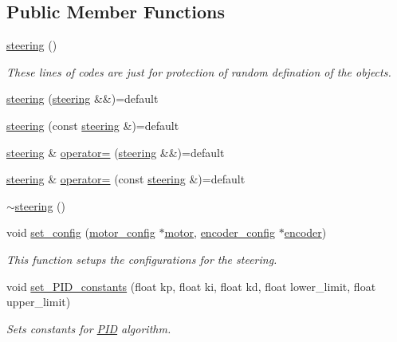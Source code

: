 \subsection*{Public Member Functions}
\begin{DoxyCompactItemize}
\item 
\mbox{\hyperlink{classsteering_a55383df3b5eb0bbd66cd9ef76c82b588}{steering}} ()
\begin{DoxyCompactList}\small\item\em These lines of codes are just for protection of random defination of the objects. \end{DoxyCompactList}\item 
\mbox{\hyperlink{classsteering_ac941b5d9c6daae87122f984819606475}{steering}} (\mbox{\hyperlink{classsteering}{steering}} \&\&)=default
\item 
\mbox{\hyperlink{classsteering_a5646ad884f0949253988d9a8ebec8278}{steering}} (const \mbox{\hyperlink{classsteering}{steering}} \&)=default
\item 
\mbox{\hyperlink{classsteering}{steering}} \& \mbox{\hyperlink{classsteering_aab3b80efec6ef14734213ec15c228543}{operator=}} (\mbox{\hyperlink{classsteering}{steering}} \&\&)=default
\item 
\mbox{\hyperlink{classsteering}{steering}} \& \mbox{\hyperlink{classsteering_ab6e1570939ecfb89acb3905efe6cb334}{operator=}} (const \mbox{\hyperlink{classsteering}{steering}} \&)=default
\item 
\mbox{\hyperlink{classsteering_a9b686e0fb626c3e8dd16ee5106a842b7}{$\sim$steering}} ()
\item 
void \mbox{\hyperlink{classsteering_a849eba14376618441a86e0ccdc1dc066}{set\+\_\+config}} (\mbox{\hyperlink{structmotor__config}{motor\+\_\+config}} $\ast$\mbox{\hyperlink{classmotor}{motor}}, \mbox{\hyperlink{structencoder__config}{encoder\+\_\+config}} $\ast$\mbox{\hyperlink{classencoder}{encoder}})
\begin{DoxyCompactList}\small\item\em This function setups the configurations for the steering. \end{DoxyCompactList}\item 
void \mbox{\hyperlink{classsteering_a6fb4cfdc9378336f78832351c4f6d181}{set\+\_\+\+P\+I\+D\+\_\+constants}} (float kp, float ki, float kd, float lower\+\_\+limit, float upper\+\_\+limit)
\begin{DoxyCompactList}\small\item\em Sets constants for \mbox{\hyperlink{class_p_i_d}{P\+ID}} algorithm. \end{DoxyCompactList}\item 

\end{DoxyCompactItemize}
